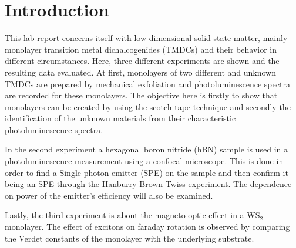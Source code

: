 \section{Introduction}

  This lab report concerns itself with low-dimensional solid state matter, mainly monolayer transition metal dichalcogenides (TMDCs) and their behavior in different circumstances.
  Here, three different experiments are shown and the resulting data evaluated.
  At first, monolayers of two different and unknown TMDCs are prepared by mechanical exfoliation and photoluminescence spectra are recorded for these monolayers.
  The objective here is firstly to show that monolayers can be created by using the scotch tape technique and secondly the identification of the unknown materials from their characteristic photoluminescence spectra.

  In the second experiment a hexagonal boron nitride (hBN) sample is used in a photoluminescence measurement using a confocal microscope.
  This is done in order to find a Single-photon emitter (SPE) on the sample and then confirm it being an SPE through the Hanburry-Brown-Twiss experiment.
  The dependence on power of the emitter's efficiency will also be examined.

  Lastly, the third experiment is about the magneto-optic effect in a WS$_2$ monolayer.
  The effect of excitons on faraday rotation is observed by comparing the Verdet constants of the monolayer with the underlying substrate.


